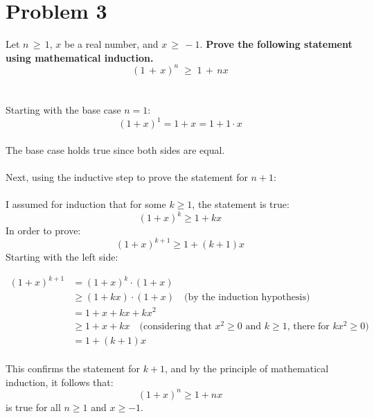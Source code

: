 \documentclass{amsart}
\theoremstyle{definition}
\theoremstyle{Exercise}
\theoremstyle{remark}
\theoremstyle{rule}
\numberwithin{equation}{section}
\begin{document}
  \section*{Problem 3}
  Let $n\, \geq \, 1$, $x$ be a real number, and $x\, \geq\,-1$. {\bf Prove the following statement using mathematical induction.}
  \[(1\,+\,x)^n\;\geq\;1\,+\,nx\]
\\\\
Starting with the base case \(n = 1\): 
\[(1 + x)^1 = 1 + x = 1 + 1 \cdot x\]\\
The base case holds true since both sides are equal.
\\\\
Next, using the inductive step to prove the statement for \(n + 1\):
\\\\
I assumed for induction that for some \(k \geq 1\), the statement is true:\\
\[(1 + x)^k \geq 1 + kx\]
In order to prove:\\
\[(1 + x)^{k + 1} \geq 1 + (k + 1)x\]
Starting with the left side:

\begin{align*}
(1 + x)^{k + 1} &= (1 + x)^k \cdot (1 + x) \\
&\geq (1 + kx) \cdot (1 + x) \quad \text{(by the induction hypothesis)} \\
&= 1 + x + kx + kx^2 \\
&\geq 1 + x + kx \quad \text{(considering that \(x^2 \geq 0\) and \(k \geq 1\), there for \(kx^2 \geq 0\))} \\
&= 1 + (k + 1)x
\end{align*}
\\
This confirms the statement for \(k + 1\), and by the principle of mathematical induction, it follows that:
\[(1 + x)^n \geq 1 + nx\]
is true for all \(n \geq 1\) and \(x \geq -1\).
\\\\
\newpage
  \section*{}
  \section*{}
\end{document}
